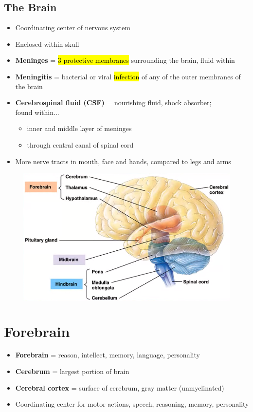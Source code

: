\documentclass[a4paper,12pt]{article}
\begin{document}
\subsection{The Brain}
\begin{itemize}
    \item{Coordinating center of nervous system}
    \item{Enclosed within skull}
    \item{\textbf{Meninges} = \hl{3 protective membranes} surrounding the brain, fluid within}
    \item{\textbf{Meningitis} = bacterial or viral \hl{infection} of any of the outer membranes of the brain}
    \item{
            \textbf{Cerebrospinal fluid (CSF)} = nourishing fluid, shock absorber; \\ found within...
            \begin{itemize}
                \item{inner and middle layer of meninges}
                \item{through central canal of spinal cord}
            \end{itemize}
        }
    \item{More nerve tracts in mouth, face and hands, compared to legs and arms}
\end{itemize}

\begin{figure}[H]
    \centering
    \includegraphics[width=\textwidth]{brains}
\end{figure}


\section{Forebrain}
\begin{itemize}
    \item{\textbf{Forebrain} = reason, intellect, memory, language, personality}
    \item{\textbf{Cerebrum} = largest portion of brain}
    \item{\textbf{Cerebral cortex} = surface of cerebrum, gray matter (unmyelinated)}
    \item{Coordinating center for motor actions, speech, reasoning, memory, personality}
\end{itemize}
\end{document}
